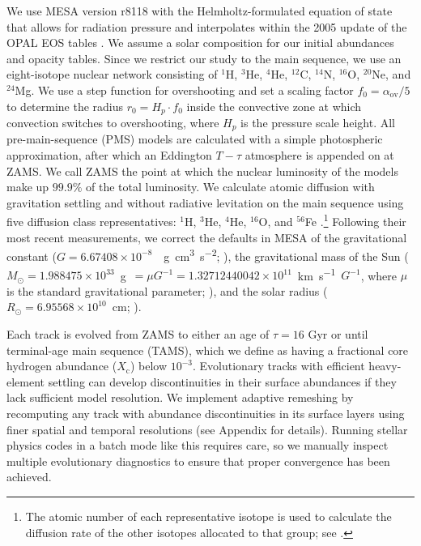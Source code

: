 We use MESA version r8118 with the Helmholtz-formulated equation of state that allows for radiation pressure and interpolates within the 2005 update of the OPAL EOS tables \citep{2002apj...576.1064r}. We assume a \citet{1998SSRv...85..161G} solar composition for our initial abundances and opacity tables. Since we restrict our study to the main sequence, we use an eight-isotope nuclear network consisting of $^1$H, $^3$He, $^4$He, $^{12}$C, $^{14}$N, $^{16}$O, $^{20}$Ne, and $^{24}$Mg. We use a step function for overshooting and set a scaling factor ${f_0 = \alpha_{\text{ov}}/5}$ to determine the radius ${r_0 = H_p \cdot f_0}$ inside the convective zone at which convection switches to overshooting, where $H_p$ is the pressure scale height.  %
All pre-main-sequence (PMS) models are calculated with a simple photospheric approximation, after which an Eddington $T-\tau$ atmosphere is appended on at ZAMS. We call ZAMS the point at which the nuclear luminosity of the models make up $99.9\%$ of the total luminosity. We calculate atomic diffusion with gravitation settling and without radiative levitation on the main sequence using five diffusion class representatives: $^1$H, $^3$He, $^4$He, $^{16}$O, and $^{56}$Fe \citep{burgers1969flow}.\footnote{The atomic number of each representative isotope is used to calculate the diffusion rate of the other isotopes allocated to that group; see \citet{2011apjs..192....3p}.} 
Following their most recent measurements, we correct the defaults in MESA of the gravitational constant (${G=6.67408\times 10^{-8}}$~\si{\per\g\cm\cubed\per\square\s}; \citealt{2015arXiv150707956M}), the gravitational mass of the Sun (${M_\odot = 1.988475\times 10^{33}}$~\si{\g}~${= \mu G^{-1} = 1.32712440042\times 10^{11}}$~\si{\km\per\s}~$G^{-1}$, where $\mu$ is the standard gravitational parameter; \citealt{pitjeva2015determination}), and the solar radius (${R_\odot = 6.95568\times 10^{10}}$~\si{\cm}; \citealt{2008ApJ...675L..53H}). 

Each track is evolved from ZAMS to either an age of ${\tau=16}$ Gyr or until terminal-age main sequence (TAMS), which we define as having a fractional core hydrogen abundance ($X_{\text{c}}$) below $10^{-3}$. Evolutionary tracks with efficient heavy-element settling can develop discontinuities in their surface abundances if they lack sufficient model resolution. We implement adaptive remeshing by recomputing any track with abundance discontinuities in its surface layers using finer spatial and temporal resolutions (see Appendix \mb{\ref{sec:remeshing}} for details). Running stellar physics codes in a batch mode like this requires care, so we manually inspect multiple evolutionary diagnostics to ensure that proper convergence has been achieved. %


